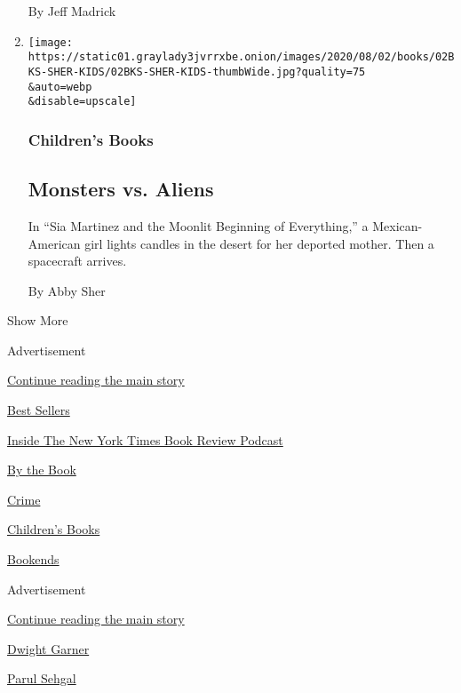 \begin{enumerate}
  By Jeff Madrick
\item
  \href{/2020/07/31/books/review/sia-martinez-and-the-moonlit-beginning-of-everything-raquel-vasquez-gilliland.html}{}

  \texttt{[image: https://static01.graylady3jvrrxbe.onion/images/2020/08/02/books/02BKS-SHER-KIDS/02BKS-SHER-KIDS-thumbWide.jpg?quality=75\\\&auto=webp\\\&disable=upscale]}

  \hypertarget{childrens-books-2}{%
  \subsubsection{Children's Books}\label{childrens-books-2}}

  \hypertarget{monsters-vs-aliens}{%
  \subsection{Monsters vs. Aliens}\label{monsters-vs-aliens}}

  In ``Sia Martinez and the Moonlit Beginning of Everything,'' a
  Mexican-American girl lights candles in the desert for her deported
  mother. Then a spacecraft arrives.

  By Abby Sher
\end{enumerate}

Show More

Advertisement

\protect\hyperlink{after-mid2}{Continue reading the main story}

\href{https://www.nytimes3xbfgragh.onion/best-sellers-books/overview.html}{Best
Sellers}

\href{https://www.nytimes3xbfgragh.onion/column/book-review-podcast}{Inside
The New York Times Book Review Podcast}

\href{https://www.nytimes3xbfgragh.onion/column/by-the-book}{By the
Book}

\href{https://www.nytimes3xbfgragh.onion/column/crime}{Crime}

\href{https://www.nytimes3xbfgragh.onion/column/childrens-books}{Children's
Books}

\href{https://www.nytimes3xbfgragh.onion/column/bookends}{Bookends}

Advertisement

\protect\hyperlink{after-mktg}{Continue reading the main story}

\href{https://www.nytimes3xbfgragh.onion/by/dwight-garner}{Dwight
Garner}

\href{https://www.nytimes3xbfgragh.onion/by/parul-sehgal}{Parul Sehgal}

